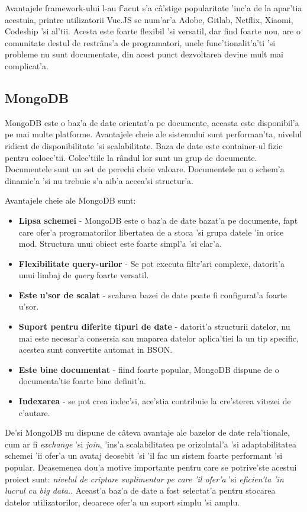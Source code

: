 \documentclass[12pt,a4paper,twoside]{report}
\begin{document}
Avantajele framework-ului l-au f'acut s'a câ'stige popularitate 'inc'a de la apar'tia acestuia, printre utilizatorii Vue.JS se num'ar'a Adobe, Gitlab, Netflix, Xiaomi, Codeship 'si al'tii. Acesta este foarte flexibil 'si versatil, dar find foarte nou, are o comunitate destul de restrâns'a de programatori, unele func'tionalit'a'ti 'si probleme nu sunt documentate, din acest punct dezvoltarea devine mult mai complicat'a.
\subsection{MongoDB}
MongoDB este o baz'a de date orientat'a pe documente, aceasta este disponibil'a pe mai multe platforme. Avantajele cheie ale sistemului sunt performan'ta, nivelul ridicat de disponibilitate 'si scalabilitate. Baza de date este container-ul fizic pentru  coloec'tii. Colec'tiile la rândul lor sunt un grup de documente. Documentele sunt  un set de perechi cheie valoare. Documentele au o schem'a dinamic'a 'si nu trebuie s'a aib'a aceea'si structur'a. 

Avantajele cheie ale MongoDB sunt:
\begin{itemize}
\item{\textbf{Lipsa schemei} - MongoDB este o baz'a de date bazat'a pe documente, fapt care ofer'a programatorilor libertatea de a stoca 'si grupa datele 'in orice mod. Structura unui obiect este foarte simpl'a 'si clar'a.}
\item{\textbf{Flexibilitate query-urilor} - Se pot executa filtr'ari complexe, datorit'a unui limbaj de \textit{query} foarte versatil.}
\item{\textbf{Este u'sor de scalat} - scalarea bazei de date poate fi configurat'a foarte u'sor.}
\item{\textbf{Suport pentru diferite tipuri de date} - datorit'a structurii datelor, nu mai este necesar'a consersia sau maparea datelor aplica'tiei la un tip specific, acestea sunt convertite automat in BSON.}
\item{\textbf{Este bine documentat} - fiind foarte popular, MongoDB dispune de o documenta'tie foarte bine definit'a.}
\item{\textbf{Indexarea} - se pot crea indec'si, ace'stia contribuie la cre'sterea vitezei de c'autare.}
\end{itemize}

De'si MongoDB nu dispune de câteva avantaje ale bazelor de date rela'tionale, cum ar fi \textit{exchange} 'si \textit{join}, 'ins'a scalabilitatea pe orizolntal'a 'si  adaptabilitatea schemei 'ii ofer'a un avataj deosebit 'si 'il fac un sistem foarte performant 'si popular. Deasemenea dou'a motive importante pentru care se potrive'ste acestui proiect sunt:  \textit{nivelul de criptare suplimentar pe care 'il ofer'a} 'si \textit{eficien'ta 'in lucrul cu big data.}. Aceast'a baz'a de date a fost selectat'a pentru stocarea datelor utilizatorilor, deoarece ofer'a un suport simplu 'si amplu.
\end{document}
